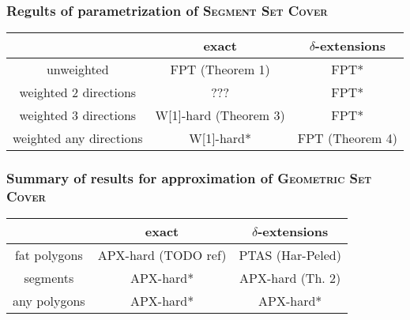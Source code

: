 \documentclass{beamer}
\begin{document}
\begin{frame}
\frametitle{Regults of parametrization of \textsc{Segment Set Cover}}

\begin{tabular}{|c|c|c|}
\hline
           & exact & $\delta$-extensions \\
\hline
unweighted & \textcolor{olivegreen}{FPT (Theorem 1)} & \textcolor{olivegreen}{FPT*} \\
\hline
weighted 2 directions & ??? & \textcolor{olivegreen}{FPT*} \\
\hline
weighted 3 directions & \textcolor{olivegreen}{W[1]-hard (Theorem 3)} &  \textcolor{olivegreen}{FPT*}\\
\hline
weighted any directions & \textcolor{olivegreen}{W[1]-hard*} &  \textcolor{olivegreen}{FPT (Theorem 4)}\\
\hline
\end{tabular}

\end{frame}


\begin{frame}
\frametitle{Summary of results for approximation of \textsc{Geometric Set Cover}}
\begin{tabular}{|c|c|c|}
\hline
           & exact & $\delta$-extensions \\
\hline
fat polygons & APX-hard (TODO ref) &  PTAS (Har-Peled)\\
\hline
segments & \textcolor{olivegreen}{APX-hard*} & \textcolor{olivegreen}{APX-hard (Th. 2)} \\
\hline
any polygons & \textcolor{olivegreen}{APX-hard*} &  \textcolor{olivegreen}{APX-hard*} \\
\hline
\end{tabular}
\end{frame}

\end{document}
